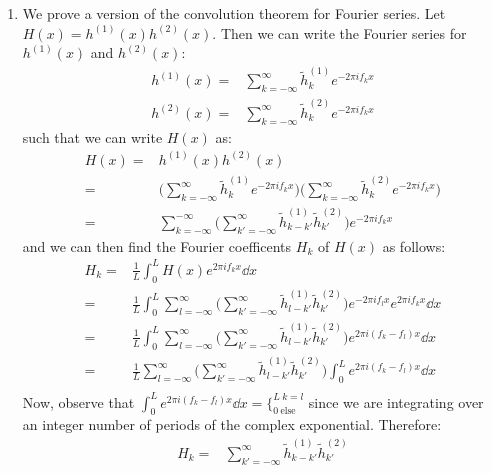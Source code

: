 \documentclass[11pt]{article}
\begin{document}
\begin{enumerate}
	\item We prove a version of the convolution theorem for Fourier series. Let $H(x) = h^{(1)}(x) h^{(2)}(x)$. Then we can write the Fourier series for $h^{(1)}(x)$ and $h^{(2)}(x)$:
	\begin{align}
	h^{(1)}(x) =& \sum_{k=-\infty}^{\infty} \tilde h_k^{(1)} e^{-2 \pi i f_k x} \\
	h^{(2)}(x) =& \sum_{k=-\infty}^{\infty} \tilde h_k^{(2)} e^{-2 \pi i f_k x}
	\end{align}
	such that we can write $H(x)$ as:
	\begin{align}
	H(x) =& h^{(1)}(x) h^{(2)}(x) \\
	=& \bigg( \sum_{k=-\infty}^{\infty} \tilde h_k^{(1)} e^{-2 \pi i f_k x} \bigg) \bigg( \sum_{k=-\infty}^{\infty} \tilde h_k^{(2)} e^{-2 \pi i f_k x} \bigg) \\
	=& \sum_{k=-\infty}^{-\infty} \bigg( \sum_{k'=-\infty}^{\infty} \tilde h_{k-k'}^{(1)} \tilde h_{k'}^{(2)} \bigg) e^{-2 \pi i f_k x}
	\end{align}
	and we can then find the Fourier coefficents $H_k$ of $H(x)$ as follows:
	\begin{align}
	H_k =& \frac{1}{L} \int_0^L H(x) e^{2 \pi i f_k x} \dd{x} \\
	=& \frac{1}{L} \int_0^L \sum_{l=-\infty}^{\infty} \bigg( \sum_{k'=-\infty}^{\infty} \tilde h_{l-k'}^{(1)} \tilde h_{k'}^{(2)} \bigg) e^{-2 \pi i f_l x} e^{2 \pi i f_k x} \dd{x} \\
	=& \frac{1}{L} \int_0^L \sum_{l=-\infty}^{\infty} \bigg( \sum_{k'=-\infty}^{\infty} \tilde h_{l-k'}^{(1)} \tilde h_{k'}^{(2)} \bigg) e^{2 \pi i (f_k - f_l) x} \dd{x} \\
	=& \frac{1}{L} \sum_{l=-\infty}^{\infty} \bigg( \sum_{k'=-\infty}^{\infty} \tilde h_{l-k'}^{(1)} \tilde h_{k'}^{(2)} \bigg) \int_0^L e^{2 \pi i (f_k - f_l) x} \dd{x} \\
	\end{align}
	Now, observe that $\int_0^L e^{2 \pi i (f_k - f_l) x} \dd{x} = \big\{_{0 \ \text{else}}^{L \ k=l}$ since we are integrating over an integer number of periods of the complex exponential. Therefore:
	\begin{align}
	H_k =& \sum_{k'=-\infty}^{\infty} \tilde h_{k-k'}^{(1)} \tilde h_{k'}^{(2)}
	\end{align}

\end{enumerate}
\end{document}
